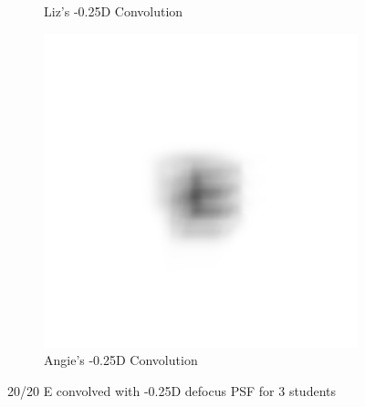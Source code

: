 \documentclass{article}
\begin{document}
\begin{figure}[H]
\begin{subfigure}{.3\textwidth}
  \caption{Liz's -0.25D Convolution}
  \label{fig:lizn025d}
\end{subfigure}
\begin{subfigure}{.3\textwidth}
  \centering
  \includegraphics[width=1\linewidth]{Angie_R_0526_1_500_zer_-025_5_PSF_convE.png}
  \caption{Angie's -0.25D Convolution}
  \label{fig:angien025d}
\end{subfigure}

\caption{20/20 E convolved with -0.25D defocus PSF for 3 students}
\label{fig:Defocus_n025D}
\end{figure}

\clearpage
\end{document}
